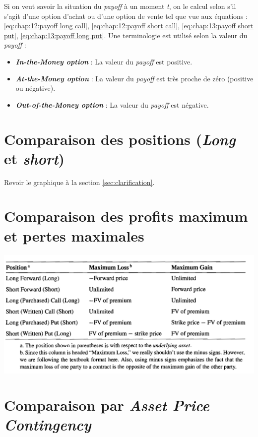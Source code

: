 \documentclass[11pt,french]{report}
\begin{document}
Si on veut savoir la situation du \emph{payoff} à un moment \textit{t}, on le calcul selon s'il s'agit d'une option d'achat ou d'une option de vente tel que vue aux équations  : \ref{eq:chap:12:payoff long call}, \ref{eq:chap:12:payoff short call}, \ref{eq:chap:13:payoff short put}, \ref{eq:chap:13:payoff long put}.
Une terminologie est utilisé selon la valeur du \emph{payoff} :
\begin{itemize}
\item \textbf{\emph{In-the-Money option}} : La valeur du \emph{payoff} est positive.
\item \textbf{\emph{At-the-Money option}} : La valeur du \emph{payoff} est très proche de zéro (positive ou négative).
\item \textbf{\emph{Out-of-the-Money option}} : La valeur du \emph{payoff} est négative.
\end{itemize}

\section{Comparaison des positions (\emph{Long} et \emph{short})}
\label{sec:position}

Revoir le graphique à la section \ref{sec:clarification}.

\section{Comparaison des profits maximum et pertes maximales}
\label{sec:profits max et pertes max}

\includegraphics[scale=0.55]{picture21.PNG}

\section{Comparaison par \emph{Asset Price Contingency}}
\label{sec:asset price contingency}
\end{document}

